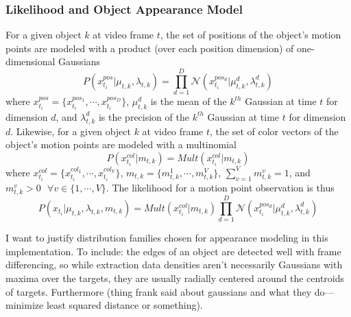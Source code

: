 \documentclass{article}
\begin{document}
\subsubsection{Likelihood and Object Appearance Model}
For a given object $k$ at video frame $t$, the set of positions of the object's motion points are modeled with a product (over each position dimension) of one-dimensional Gaussians
\begin{equation}
P(x_{t_{i}}^{pos} | \mu_{t, k}, \lambda_{t, k}) = \prod_{d=1}^{D} \mathcal{N}(x_{t_{i}}^{pos_{d}} | \mu_{t, k}^{d}, \lambda_{t, k}^{d})
\end{equation}
where $x_{t_{i}}^{pos} = \{ x_{t_{i}}^{pos_{1}}, \cdots, x_{t_{i}}^{pos_{D}} \}$,  $\mu_{t, k}^{d}$ is the mean of the $k^{th}$ Gaussian at time $t$ for dimension $d$, and $\lambda_{t, k}^{d}$ is the precision of the $k^{th}$ Gaussian at time $t$ for dimension $d$.  Likewise, for a given object $k$ at video frame $t$, the set of color vectors of the object's motion points are modeled with a multinomial
\begin{equation}
P(x_{t_{i}}^{col} | m_{t, k}) = Mult(x_{t_{i}}^{col} | m_{t, k})
\end{equation}
where $x_{t_{i}}^{col} = \{ x_{t_{i}}^{col_{1}}, \cdots, x_{t_{i}}^{col_{V}} \}$, $m_{t,k} = \{ m_{t,k}^{1}, \cdots, m_{t,k}^{V} \}$, $\sum_{v=1}^{V} m_{t, k}^{v} = 1$, and $m_{t,k}^{v}>0 \hspace{8pt} \forall v \in \{ 1, \cdots, V \}$. The likelihood for a motion point observation is thus
\begin{equation}
P(x_{t_{i}} | \mu_{t, k}, \lambda_{t, k}, m_{t, k}) =  Mult(x_{t_{i}}^{col} | m_{t, k})   \prod_{d=1}^{D}  \mathcal{N}(x_{t_{i}}^{pos_{d}} | \mu_{t, k}^{d}, \lambda_{t, k}^{d}) 
\end{equation}

I want to justify distribution families chosen for appearance modeling in this implementation. To include: the edges of an object are detected well with frame differencing, so while extraction data densities aren't necessarily Gaussians with maxima over the targets, they are usually radially centered around the centroids of targets. Furthermore (thing frank said about gaussians and what they do---minimize least squared distance or something).
\end{document}

